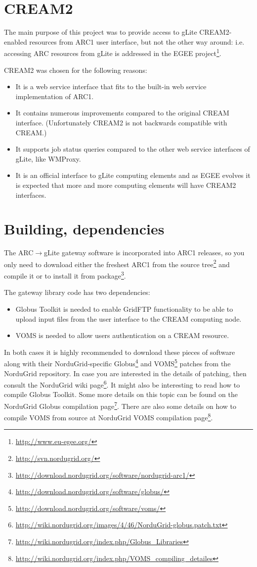 \documentclass{article}
\begin{document}
\section{CREAM2}
The main purpose of this project was to provide access to gLite CREAM2-enabled resources from ARC1 user interface, but not the other way around: i.e. accessing ARC resources from gLite is addressed in the EGEE project\footnote{\url{http://www.eu-egee.org/}}.\par
CREAM2 was chosen for the following reasons:
\begin{itemize}
\item It is a web service interface that fits to the built-in web service implementation of ARC1.
\item It contains numerous improvements compared to the original CREAM interface. (Unfortunately CREAM2 is not backwards compatible with CREAM.)
\item It supports job status queries compared to the other web service interfaces of gLite, like WMProxy.
\item It is an official interface to gLite computing elements and as EGEE evolves it is expected that more and more computing elements will have CREAM2 interfaces.
\end{itemize}
\section{Building, dependencies}
\label{Building}
The ARC$\rightarrow$gLite gateway software is incorporated into ARC1 releases, so you only need to download either the freshest ARC1 from the source tree\footnote{\url{http://svn.nordugrid.org/}} and compile it or to install it from package\footnote{\url{http://download.nordugrid.org/software/nordugrid-arc1/}}.\par
The gateway library code has two dependencies:
\begin{itemize}
\item Globus Toolkit is needed to enable GridFTP functionality to be able to upload input files from the user interface to the CREAM computing node.
\item VOMS is needed to allow users authentication on a CREAM resource.
\end{itemize}
In both cases it is highly recommended to download these pieces of software along with their NorduGrid-specific Globus\footnote{\url{http://download.nordugrid.org/software/globus/}} and VOMS\footnote{\url{http://download.nordugrid.org/software/voms/}} patches from the NorduGrid repository. In case you are interested in the details of patching, then consult the NorduGrid wiki page\footnote{\url{http://wiki.nordugrid.org/images/4/46/NorduGrid-globus.patch.txt}}. It might also be interesting to read how to compile Globus Toolkit. Some more details on this topic can be found on the NorduGrid Globus compilation page\footnote{\url{http://wiki.nordugrid.org/index.php/Globus\_Libraries}}. There are also some details on how to compile VOMS from source at NorduGrid VOMS compilation page\footnote{\url{http://wiki.nordugrid.org/index.php/VOMS\_compiling\_detailes}}.
\end{document}
